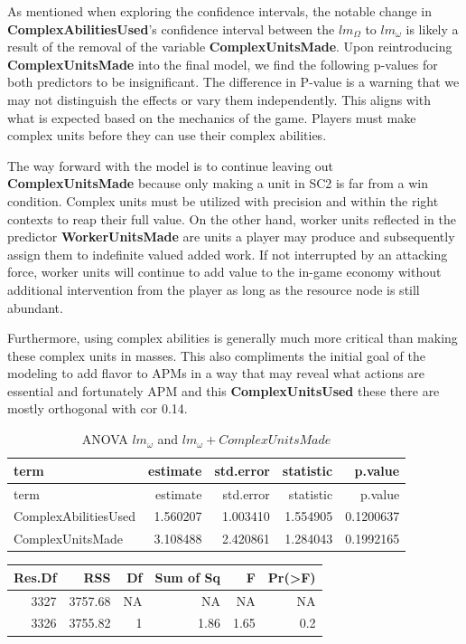 \documentclass[]{article}
\begin{document}
As mentioned when exploring the confidence intervals, the notable change
in \textbf{ComplexAbilitiesUsed}'s confidence interval between the
\(lm_\Omega\) to \(lm_\omega\) is likely a result of the removal of the
variable \textbf{ComplexUnitsMade}. Upon reintroducing
\textbf{ComplexUnitsMade} into the final model, we find the following
p-values for both predictors to be insignificant. The difference in
P-value is a warning that we may not distinguish the effects or vary
them independently. This aligns with what is expected based on the
mechanics of the game. Players must make complex units before they can
use their complex abilities.

The way forward with the model is to continue leaving out
\textbf{ComplexUnitsMade} because only making a unit in SC2 is far from
a win condition. Complex units must be utilized with precision and
within the right contexts to reap their full value. On the other hand,
worker units reflected in the predictor \textbf{WorkerUnitsMade} are
units a player may produce and subsequently assign them to indefinite
valued added work. If not interrupted by an attacking force, worker
units will continue to add value to the in-game economy without
additional intervention from the player as long as the resource node is
still abundant.

Furthermore, using complex abilities is generally much more critical
than making these complex units in masses. This also compliments the
initial goal of the modeling to add flavor to APMs in a way that may
reveal what actions are essential and fortunately APM and this
\textbf{ComplexUnitsUsed} these there are mostly orthogonal with cor
0.14.

\begin{longtable}[]{@{}lrrrr@{}}
\caption{ANOVA \(lm_\omega\) and
\(lm_\omega+ComplexUnitsMade\)}\tabularnewline
\toprule
term & estimate & std.error & statistic & p.value\tabularnewline
\midrule
\endfirsthead
\toprule
term & estimate & std.error & statistic & p.value\tabularnewline
\midrule
\endhead
ComplexAbilitiesUsed & 1.560207 & 1.003410 & 1.554905 &
0.1200637\tabularnewline
ComplexUnitsMade & 3.108488 & 2.420861 & 1.284043 &
0.1992165\tabularnewline
\bottomrule
\end{longtable}

\begin{longtable}[]{@{}rrrrrr@{}}
\toprule
Res.Df & RSS & Df & Sum of Sq & F & Pr(\textgreater{}F)\tabularnewline
\midrule
\endhead
3327 & 3757.68 & NA & NA & NA & NA\tabularnewline
3326 & 3755.82 & 1 & 1.86 & 1.65 & 0.2\tabularnewline
\bottomrule
\end{longtable}
\end{document}
